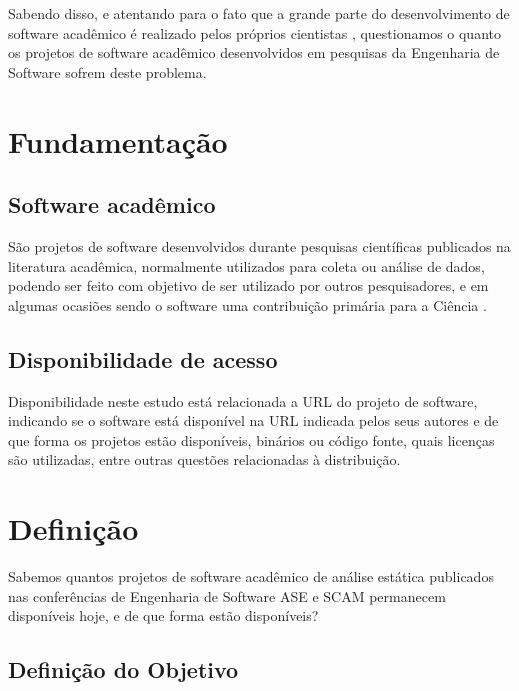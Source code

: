 Sabendo disso, e atentando para o fato que a grande parte do desenvolvimento de
software acadêmico é realizado pelos próprios cientistas \cite{hettrick2014uk,
momcheva2015software}, questionamos o quanto os projetos de software acadêmico
desenvolvidos em pesquisas da Engenharia de Software sofrem deste problema.


\section{Fundamentação} \label{estudo1:fundamentacao} %

\subsection{Software acadêmico}

São projetos de software desenvolvidos durante pesquisas científicas publicados
na literatura acadêmica, normalmente utilizados para coleta ou análise de
dados, podendo ser feito com objetivo de ser utilizado por outros
pesquisadores, e em algumas ocasiões sendo o software uma contribuição primária
para a Ciência \cite{howison2011scientific}.

\subsection{Disponibilidade de acesso}

Disponibilidade neste estudo está relacionada a URL do projeto de software,
indicando se o software está disponível na URL indicada pelos seus autores e de
que forma os projetos estão disponíveis, binários ou código fonte, quais
licenças são utilizadas, entre outras questões relacionadas à distribuição.


\section{Definição} \label{estudo1:definicao} %

Sabemos quantos projetos de software acadêmico de análise estática publicados
nas conferências de Engenharia de Software ASE e SCAM permanecem disponíveis
hoje, e de que forma estão disponíveis?

\subsection{Definição do Objetivo}


